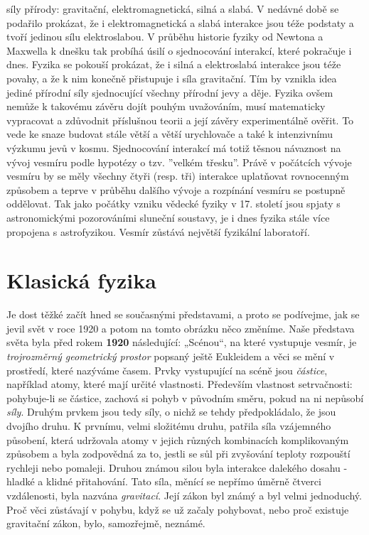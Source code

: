     síly přírody: gravitační, elektromagnetická, silná a slabá. V nedávné době se podařilo prokázat,
    že i elektromagnetická a slabá interakce jsou téže podstaty a tvoří jedinou sílu elektroslabou.
    V průběhu historie fyziky od Newtona a Maxwella k dnešku tak probíhá úsilí o sjednocování
    interakcí, které pokračuje i dnes. Fyzika se pokouší prokázat, že i silná a elektroslabá
    interakce jsou téže povahy, a že k nim konečně přistupuje i síla gravitační. Tím by vznikla idea
    jediné přírodní síly sjednocující všechny přírodní jevy a děje. Fyzika ovšem nemůže k takovému
    závěru dojít pouhým uvažováním, musí matematicky vypracovat a zdůvodnit příslušnou teorii a její
    závěry experimentálně ověřit. To vede ke snaze budovat stále větší a větší urychlovače a také k
    intenzivnímu výzkumu jevů v kosmu. Sjednocování interakcí má totiž těsnou návaznost na vývoj
    vesmíru podle hypotézy o tzv. ”velkém třesku”. Právě v počátcích vývoje vesmíru by se měly
    všechny čtyři (resp. tři) interakce uplatňovat rovnocenným způsobem a teprve v průběhu dalšího
    vývoje a rozpínání vesmíru se postupně oddělovat. Tak jako počátky vzniku vědecké fyziky v 17.
    století jsou spjaty s astronomickými pozorováními sluneční soustavy, je i dnes fyzika stále více
    propojena s astrofyzikou. Vesmír zůstává největší fyzikální laboratoří.

  \section{Klasická fyzika}\label{fyz:IchapIIsecIII}
    Je dost těžké začít hned se současnými představami, a proto se podívejme, jak se jevil svět v
    roce 1920 a potom na tomto obrázku něco změníme. Naše představa světa byla před rokem
    \textbf{1920} následující: „Scénou“, na které vystupuje vesmír, je \emph{trojrozměrný
    geometrický prostor} popsaný ještě Eukleidem a věci se mění v prostředí, které nazýváme časem.
    Prvky vystupující na scéně jsou \emph{částice}, například atomy, které mají určité vlastnosti.
    Především vlastnost setrvačnosti: pohybuje-li se částice, zachová si pohyb v původním směru,
    pokud na ni nepůsobí \emph{síly}. Druhým prvkem jsou tedy síly, o nichž se tehdy  
    předpokládalo, že jsou dvojího druhu. K prvnímu, velmi složitému druhu, patřila síla vzájemného
    působení, která udržovala atomy v jejich různých kombinacích komplikovaným způsobem a byla
    zodpovědná za to, jestli se sůl při zvyšování teploty rozpouští rychleji nebo pomaleji. Druhou
    známou silou byla interakce dalekého dosahu - hladké a klidné přitahování. Tato síla, měnící se
    nepřímo úměrně čtverci vzdálenosti, byla nazvána \emph{gravitací}. Její zákon byl známý a byl
    velmi jednoduchý. Proč věci zůstávají v pohybu, když se už začaly pohybovat, nebo proč existuje
    gravitační zákon, bylo, samozřejmě, neznámé.
    
